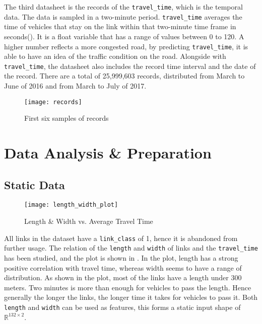 The third datasheet is the records of the \verb|travel_time|, which is the temporal data. The data is sampled in a two-minute period.
\verb|travel_time| averages the time of vehicles that stay on the link within that two-minute time frame in seconds(). 
It is a float variable that has a range of values between 0 to 120. 
A higher number reflects a more congested road, by predicting \verb|travel_time|, it is able to have an idea of the traffic condition on the road.
Alongside with \verb|travel_time|, the datasheet also includes the record time interval and the date of the record. 
There are a total of 25,999,603 records, distributed from March to June of 2016 and from March to July of 2017.

\begin{figure}[!htb]
    \centering
    \texttt{[image: records]}
    \caption{First six samples of records}
    \label{Figure:records}
\end{figure}

\section{Data Analysis \& Preparation}

\subsection{Static Data} \label{Section:StaticData}

\begin{figure}[!htb]
    \centering
    \texttt{[image: length\_width\_plot]}
    \caption{Length \& Width vs. Average Travel Time}
    \label{Figure:length_width}
\end{figure}

All links in the dataset have a \verb|link_class| of 1, hence it is abandoned from further usage. 
The relation of the \verb|length| and \verb|width| of links and the \verb|travel_time| has been studied, and the plot is shown in .
In the plot, length has a strong positive correlation with travel time, whereas width seems to have a range of distribution.
As shown in the plot, most of the links have a length under 300 meters. Two minutes is more than enough for vehicles to pass the length. 
Hence generally the longer the links, the longer time it takes for vehicles to pass it. 
Both \verb|length| and \verb|width| can be used as features, this forms a static input shape of $\mathbb{R}^{132\times 2}$. 

